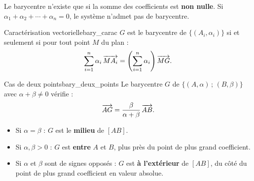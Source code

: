 \begin{attention}
	Le barycentre n'existe que si la somme des coefficients est \textbf{non nulle}.
	Si $\alpha_1 + \alpha_2 + \cdots + \alpha_n = 0$, le système n'admet pas de barycentre.
\end{attention}

\begin{propriete}{Caractérisation vectorielle}{bary_carac}
	$G$ est le barycentre de $\{(A_i, \alpha_i)\}$ si et seulement si pour tout point $M$
	du plan :
	$$
	\sum_{i=1}^{n} \alpha_i\,\overrightarrow{MA_i} = \left(\sum_{i=1}^{n} \alpha_i\right)\overrightarrow{MG}.
	$$
\end{propriete}

\begin{propriete}{Cas de deux points}{bary_deux_points}
	Le barycentre $G$ de $\{(A,\alpha)\,;\,(B,\beta)\}$ avec $\alpha + \beta \neq 0$
	vérifie :
	$$
	\overrightarrow{AG} = \frac{\beta}{\alpha+\beta}\,\overrightarrow{AB}.
	$$
	\begin{itemize}[label=\textbullet]
		\item Si $\alpha = \beta$ : $G$ est le \textbf{milieu} de $[AB]$.
		\item Si $\alpha, \beta > 0$ : $G$ est \textbf{entre} $A$ et $B$, plus près
		du point de plus grand coefficient.
		\item Si $\alpha$ et $\beta$ sont de signes opposés : $G$ est \textbf{à
		l'extérieur} de $[AB]$, du côté du point de plus grand coefficient en
		valeur absolue.
	\end{itemize}
\end{propriete}

\begin{center}
\end{center}

